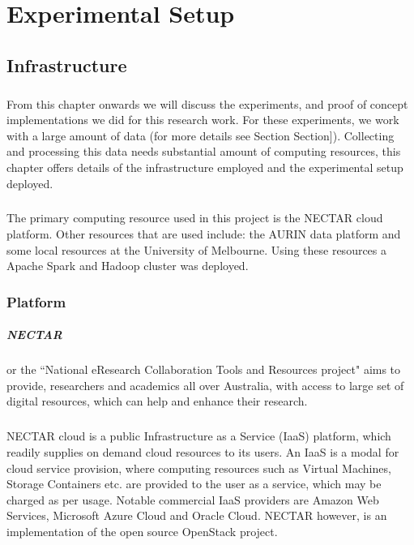\documentclass[12pt]{report}
\theoremstyle{named}
\begin{document}
\chapter{Experimental Setup}
\section{Infrastructure}
\paragraph{}
From this chapter onwards we will discuss the experiments, and proof of concept implementations we did for this research work. For these experiments, we work with a large amount of data (for more details see Section 
Section]). Collecting and processing this data needs substantial amount of computing resources, this chapter offers details of the infrastructure employed and the experimental setup deployed.
\paragraph{}
The primary computing resource used in this project is the NECTAR\cite{NECTAR} cloud platform. Other resources that are used include: the AURIN\cite{AURIN} data platform and some local resources at the University of Melbourne. Using these resources a Apache Spark and Hadoop cluster was deployed.

\subsection{Platform}
\paragraph{NECTAR} or the ``National eResearch Collaboration Tools and Resources project" aims to provide, researchers and academics all over Australia, with access to large set of digital resources, which can help and enhance their research. 
\paragraph{}
NECTAR cloud is a public Infrastructure as a Service (IaaS) platform, which readily supplies on demand cloud resources to its users. An IaaS is a modal for cloud service provision, where computing resources such as Virtual Machines, Storage Containers etc. are provided to the user as a service, which may be charged as per usage. Notable commercial IaaS providers are Amazon Web Services\cite{AWS}, Microsoft Azure Cloud\cite{Azure} and Oracle Cloud\cite{OracleCloud}. NECTAR however, is an implementation of the open source OpenStack\cite{OpenStack} project.
\end{document}
